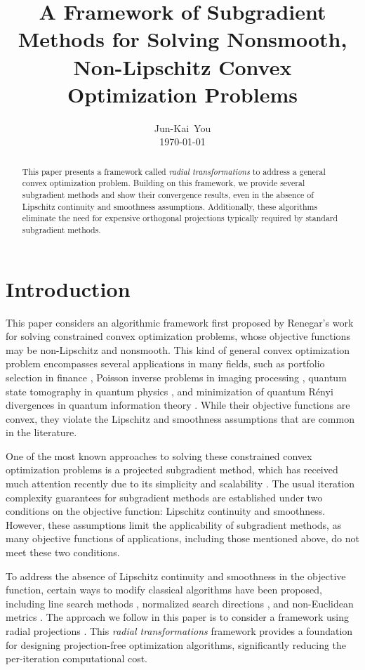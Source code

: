 \documentclass{article}
\title{A Framework of Subgradient Methods for Solving Nonsmooth, Non-Lipschitz Convex Optimization Problems}
\author{Jun-Kai~You \\ \monthyeardate\today}
\date{}
\begin{document}
\maketitle
\begin{abstract}
This paper presents a framework called \emph{radial transformations} to address a general convex optimization problem. Building on this framework, we provide several subgradient methods and show their convergence results, even in the absence of Lipschitz continuity and smoothness assumptions. Additionally, these algorithms eliminate the need for expensive orthogonal projections typically required by standard subgradient methods.
\end{abstract}

\section{Introduction}
This paper considers an algorithmic framework first proposed by Renegar's work \cite{Renegar2016} for solving constrained convex optimization problems, whose objective functions may be non-Lipschitz and nonsmooth. This kind of general convex optimization problem encompasses several applications in many fields, such as portfolio selection in finance \cite{Maclean2012}, Poisson inverse problems in imaging processing \cite{Bertero2009, Hohage2016}, quantum state tomography in quantum physics \cite{Hradil1997, Paris2004}, and minimization of quantum Rényi divergences in quantum information theory \cite{You2022}. While their objective functions are convex, they violate the Lipschitz and smoothness assumptions that are common in the literature.

One of the most known approaches to solving these constrained convex optimization problems is a projected subgradient method, which has received much attention recently due to its simplicity and scalability \cite{Nest2004, Bub2015}. The usual iteration complexity guarantees for subgradient methods are established under two conditions on the objective function: Lipschitz continuity and smoothness. However, these assumptions limit the applicability of subgradient methods, as many objective functions of applications, including those mentioned above, do not meet these two conditions. 

To address the absence of Lipschitz continuity and smoothness in the objective function, certain ways to modify classical algorithms have been proposed, including line search methods \cite{ZLu2023}, normalized search directions \cite{Grimmer2019}, and non-Euclidean metrics \cite{Haihao2018, Bauschke2017}. The approach we follow in this paper is to consider a framework using radial projections \cite{Renegar2016, Grimmer2018, Grimmer2024a}. This \emph{radial transformations} framework provides a foundation for designing projection-free 
optimization algorithms, significantly reducing the per-iteration computational cost.
\end{document}

